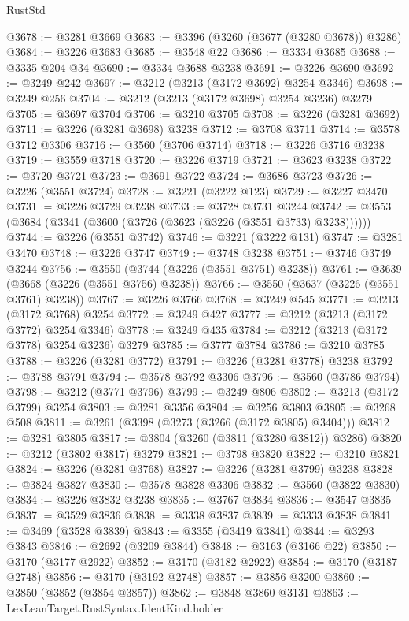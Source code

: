 \begin{lexlean}{RustStd}
\begin{coremodule}
@3678 := @3281 @3669
@3683 := @3396 (@3260 (@3677 (@3280 @3678)) @3286)
@3684 := @3226 @3683
@3685 := @3548 @22
@3686 := @3334 @3685
@3688 := @3335 @204 @34
@3690 := @3334 @3688 @3238
@3691 := @3226 @3690
@3692 := @3249 @242
@3697 := @3212 (@3213 (@3172 @3692) @3254 @3346)
@3698 := @3249 @256
@3704 := @3212 (@3213 (@3172 @3698) @3254 @3236) @3279
@3705 := @3697 @3704
@3706 := @3210 @3705
@3708 := @3226 (@3281 @3692)
@3711 := @3226 (@3281 @3698) @3238
@3712 := @3708 @3711
@3714 := @3578 @3712 @3306
@3716 := @3560 (@3706 @3714)
@3718 := @3226 @3716 @3238
@3719 := @3559 @3718
@3720 := @3226 @3719
@3721 := @3623 @3238
@3722 := @3720 @3721
@3723 := @3691 @3722
@3724 := @3686 @3723
@3726 := @3226 (@3551 @3724)
@3728 := @3221 (@3222 @123)
@3729 := @3227 @3470
@3731 := @3226 @3729 @3238
@3733 := @3728 @3731 @3244
@3742 := @3553 (@3684 (@3341 (@3600 (@3726 (@3623 (@3226 (@3551 @3733) @3238))))))
@3744 := @3226 (@3551 @3742)
@3746 := @3221 (@3222 @131)
@3747 := @3281 @3470
@3748 := @3226 @3747
@3749 := @3748 @3238
@3751 := @3746 @3749 @3244
@3756 := @3550 (@3744 (@3226 (@3551 @3751) @3238))
@3761 := @3639 (@3668 (@3226 (@3551 @3756) @3238))
@3766 := @3550 (@3637 (@3226 (@3551 @3761) @3238))
@3767 := @3226 @3766
@3768 := @3249 @545
@3771 := @3213 (@3172 @3768) @3254
@3772 := @3249 @427
@3777 := @3212 (@3213 (@3172 @3772) @3254 @3346)
@3778 := @3249 @435
@3784 := @3212 (@3213 (@3172 @3778) @3254 @3236) @3279
@3785 := @3777 @3784
@3786 := @3210 @3785
@3788 := @3226 (@3281 @3772)
@3791 := @3226 (@3281 @3778) @3238
@3792 := @3788 @3791
@3794 := @3578 @3792 @3306
@3796 := @3560 (@3786 @3794)
@3798 := @3212 (@3771 @3796)
@3799 := @3249 @806
@3802 := @3213 (@3172 @3799) @3254
@3803 := @3281 @3356
@3804 := @3256 @3803
@3805 := @3268 @508
@3811 := @3261 (@3398 (@3273 (@3266 (@3172 @3805) @3404)))
@3812 := @3281 @3805
@3817 := @3804 (@3260 (@3811 (@3280 @3812)) @3286)
@3820 := @3212 (@3802 @3817) @3279
@3821 := @3798 @3820
@3822 := @3210 @3821
@3824 := @3226 (@3281 @3768)
@3827 := @3226 (@3281 @3799) @3238
@3828 := @3824 @3827
@3830 := @3578 @3828 @3306
@3832 := @3560 (@3822 @3830)
@3834 := @3226 @3832 @3238
@3835 := @3767 @3834
@3836 := @3547 @3835
@3837 := @3529 @3836
@3838 := @3338 @3837
@3839 := @3333 @3838
@3841 := @3469 (@3528 @3839)
@3843 := @3355 (@3419 @3841)
@3844 := @3293 @3843
@3846 := @2692 (@3209 @3844)
@3848 := @3163 (@3166 @22)
@3850 := @3170 (@3177 @2922)
@3852 := @3170 (@3182 @2922)
@3854 := @3170 (@3187 @2748)
@3856 := @3170 (@3192 @2748)
@3857 := @3856 @3200
@3860 := @3850 (@3852 (@3854 @3857))
@3862 := @3848 @3860 @3131
@3863 := LexLeanTarget.RustSyntax.IdentKind.holder

\end{coremodule}
\end{lexlean}
